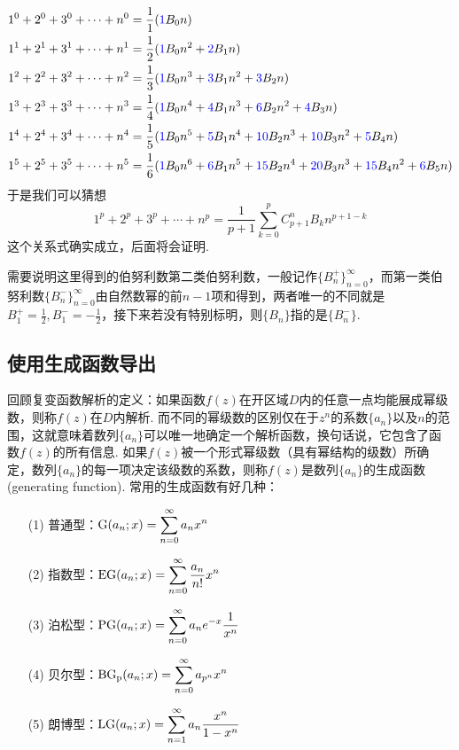 \documentclass[UTF8]{ctexart}
\newcommand{\trm}[1]{{\rm #1}}
\begin{document}
\begin{align*}
    1^0+2^0+3^0+ \cdots +n^0 &= \frac{1}{1}({\color{blue}1}B_0n) \\
    1^1+2^1+3^1+ \cdots +n^1 &= \frac{1}{2}({\color{blue}1}B_0n^2+{\color{blue}2}B_1n) \\
    1^2+2^2+3^2+ \cdots +n^2 &= \frac{1}{3}({\color{blue}1}B_0n^3+{\color{blue}3}B_1n^2+{\color{blue}3}B_2n) \\
    1^3+2^3+3^3+ \cdots +n^3 &= \frac{1}{4}({\color{blue}1}B_0n^4+{\color{blue}4}B_1n^3+{\color{blue}6}B_2n^2+{\color{blue}4}B_3n) \\
    1^4+2^4+3^4+ \cdots +n^4 &= \frac{1}{5}({\color{blue}1}B_0n^5+{\color{blue}5}B_1n^4+{\color{blue}10}B_2n^3+{\color{blue}10}B_3n^2+{\color{blue}5}B_4n) \\
    1^5+2^5+3^5+ \cdots +n^5 &= \frac{1}{6}({\color{blue}1}B_0n^6+{\color{blue}6}B_1n^5+{\color{blue}15}B_2n^4+{\color{blue}20}B_3n^3+{\color{blue}15}B_4n^2+{\color{blue}6}B_5n)
\end{align*}
于是我们可以猜想
\[1^p+2^p+3^p+ \cdots +n^p = \frac{1}{p+1}\sum_{k=0}^{p}C_{p+1}^{n}B_kn^{p+1-k}\]
这个关系式确实成立，后面将会证明.

需要说明这里得到的伯努利数第二类伯努利数，一般记作\(\{B_{n}^+\}_{n=0}^{\infty}\)，而第一类伯努利数\(\{B_n^-\}_{n=0}^{\infty}\)由自然数幂的前\(n-1\)项和得到，两者唯一的不同就是\(\displaystyle{B_1^+ = \frac{1}{2}, B_1^- = -\frac{1}{2}}\)，接下来若没有特别标明，则\(\{B_n\}\)指的是\(\{B_n^-\}\).

\subsection{使用生成函数导出}

回顾复变函数解析的定义：如果函数\(f(z)\)在开区域\(D\)内的任意一点均能展成幂级数，则称\(f(z)\)在\(D\)内解析. 而不同的幂级数的区别仅在于\(z^n\)的系数\(\{a_n\}\)以及\(n\)的范围，这就意味着数列\(\{a_n\}\)可以唯一地确定一个解析函数，换句话说，它包含了函数\(f(z)\)的所有信息. 如果\(f(z)\)被一个形式幂级数（具有幂结构的级数）所确定，数列\(\{a_n\}\)的每一项决定该级数的系数，则称\(f(z)\)是数列\(\{a_n\}\)的生成函数(generating function). 常用的生成函数有好几种：
\begin{itemize}
    \item[(1)] 普通型：\(\displaystyle{\trm{G}(a_n;x) = \sum_{n=0}^{\infty}a_nx^n}\)
    \item[(2)] 指数型：\(\displaystyle{\trm{EG}(a_n;x) = \sum_{n=0}^{\infty}\frac{a_n}{n!}x^n}\)
    \item[(3)] 泊松型：\(\displaystyle{\trm{PG}(a_n;x) = \sum_{n=0}^{\infty} a_ne^{-x}\frac{1}{x^n}}\) 
    \item[(4)] 贝尔型：\(\displaystyle{\trm{BG_p}(a_n;x) = \sum_{n=0}^{\infty} a_{p^n}x^n}\) 
    \item[(5)] 朗博型：\(\displaystyle{\trm{LG}(a_n;x) = \sum_{n=1}^{\infty}a_n\frac{x^n}{1-x^n}}\)
\end{itemize}
\end{document}
